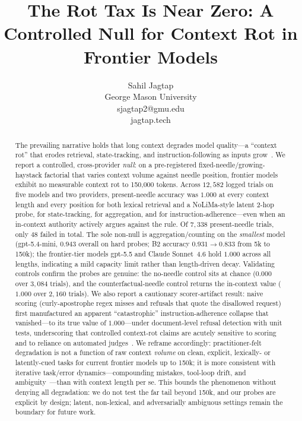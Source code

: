 \documentclass[11pt]{article}
\title{The Rot Tax Is Near Zero: A Controlled Null for Context Rot in Frontier Models}
\author{Sahil Jagtap \\ George Mason University \\ sjagtap2@gmu.edu \\ jagtap.tech}
\date{}
\begin{document}
\maketitle

\begin{abstract}
The prevailing narrative holds that long context degrades model quality---a ``context rot'' that erodes retrieval, state-tracking, and instruction-following as inputs grow~\cite{hong2025contextrot,liu2024lostmiddle,modarressi2025nolima}. We report a controlled, cross-provider \emph{null}: on a pre-registered fixed-needle/growing-haystack factorial that varies context volume against needle position, frontier models exhibit no measurable context rot to 150{,}000 tokens. Across $12{,}582$ logged trials on five models and two providers, present-needle accuracy was $1.000$ at every context length and every position for both lexical retrieval and a NoLiMa-style latent 2-hop probe, for state-tracking, for aggregation, and for instruction-adherence---even when an in-context authority actively argues against the rule. Of $7{,}338$ present-needle trials, only $48$ failed in total. The sole non-null is aggregation/counting on the \emph{smallest} model (gpt-5.4-mini, $0.943$ overall on hard probes; B2 accuracy $0.931 \to 0.833$ from 5k to 150k); the frontier-tier models gpt-5.5 and Claude Sonnet~4.6 hold $1.000$ across all lengths, indicating a mild capacity limit rather than length-driven decay. Validating controls confirm the probes are genuine: the no-needle control sits at chance ($0.000$ over $3{,}084$ trials), and the counterfactual-needle control returns the in-context value ($1.000$ over $2{,}160$ trials). We also report a cautionary scorer-artifact result: naive scoring (curly-apostrophe regex misses and refusals that quote the disallowed request) first manufactured an apparent ``catastrophic'' instruction-adherence collapse that vanished---to its true value of $1.000$---under document-level refusal detection with unit tests, underscoring that controlled context-rot claims are acutely sensitive to scoring and to reliance on automated judges~\cite{zheng2023judge}. We reframe accordingly: practitioner-felt degradation is not a function of raw context \emph{volume} on clean, explicit, lexically- or latently-cued tasks for current frontier models up to 150k; it is more consistent with iterative task/error dynamics---compounding mistakes, tool-loop drift, and ambiguity~\cite{orlanski2026slopcodebench}---than with context length per se. This bounds the phenomenon without denying all degradation: we do not test the far tail beyond 150k, and our probes are explicit by design; latent, non-lexical, and adversarially ambiguous settings remain the boundary for future work.
\end{abstract}
\end{document}
